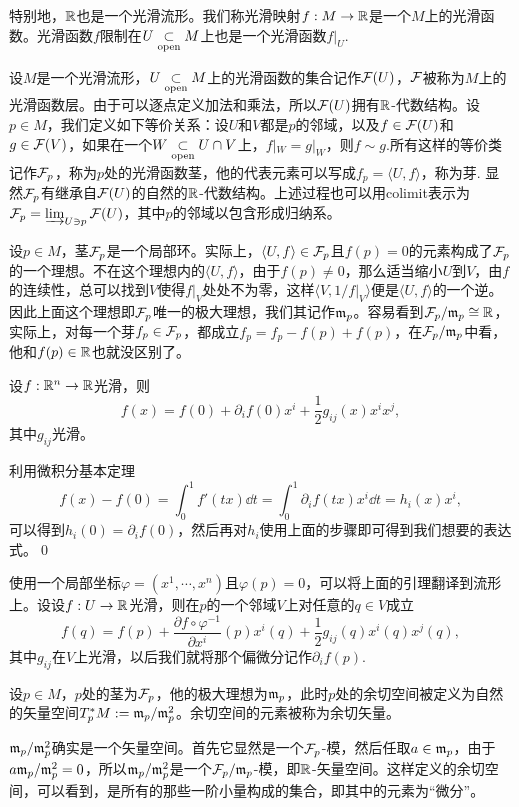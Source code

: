 特别地，$\mathbb{R}$也是一个光滑流形。我们称光滑映射$f:M\to \mathbb{R}$是一个$M$上的光滑函数。光滑函数$f$限制在$U\underset{\mathrm{open}}{\subset} M$上也是一个光滑函数$f|_U$.

\para 设$M$是一个光滑流形，$U\underset{\mathrm{open}}{\subset} M$上的光滑函数的集合记作$\mathcal{F}(U)$，$\mathcal{F}$被称为$M$上的光滑函数{\kaishu 层}。由于可以逐点定义加法和乘法，所以$\mathcal{F}(U)$拥有$\mathbb{R}$-代数结构。设$p\in M$，我们定义如下等价关系：设$U$和$V$都是$p$的邻域，以及$f\in \mathcal{F}(U)$和$g\in \mathcal{F}(V)$，如果在一个$W\underset{\mathrm{open}}{\subset} U\cap V$上，$f|_W=g|_W$，则$f\sim g$.所有这样的等价类记作$\mathcal{F}_p$，称为$p$处的光滑函数{\kaishu 茎}，他的代表元素可以写成$f_p=\langle U,f\rangle$，称为{\kaishu 芽}. 显然$\mathcal{F}_p$有继承自$\mathcal{F}(U)$的自然的$\mathbb{R}$-代数结构。上述过程也可以用colimit表示为$\mathcal{F}_p=\varinjlim_{U\ni p}\mathcal{F}(U)$，其中$p$的邻域以包含形成归纳系。

设$p\in M$，茎$\mathcal{F}_p$是一个局部环。实际上，$\langle U,f\rangle \in \mathcal{F}_p$且$f(p)= 0$的元素构成了$\mathcal{F}_p$的一个理想。不在这个理想内的$\langle U,f\rangle$，由于$f(p)\neq 0$，那么适当缩小$U$到$V$，由$f$的连续性，总可以找到$V$使得$f|_V$处处不为零，这样$\langle V,1/f|_V\rangle$便是$\langle U,f\rangle$的一个逆。因此上面这个理想即$\mathcal{F}_p$唯一的极大理想，我们其记作$\mathfrak{m}_p$。容易看到$\mathcal{F}_p/\mathfrak{m}_p\cong \mathbb{R}$，实际上，对每一个芽$f_p\in\mathcal{F}_p$，都成立$f_p=f_p-f(p)+f(p)$，在$\mathcal{F}_p/\mathfrak{m}_p$中看，他和$f(p)\in\mathbb{R}$也就没区别了。

\lem 设$f:\mathbb{R}^n\to \mathbb{R}$光滑，则
\[
	f(x)=f(0)+\partial_if(0)x^i+\frac{1}{2}g_{ij}(x)x^ix^j,
\]
其中$g_{ij}$光滑。

\proof 利用微积分基本定理
\[
	f(x)-f(0)=\int_0^1f'(tx)\dd t=\int_0^1\partial_i f(tx)x^i\dd t=h_i(x)x^i,
\]
可以得到$h_i(0)=\partial_i f(0)$，然后再对$h_i$使用上面的步骤即可得到我们想要的表达式。\qed

\para 使用一个局部坐标$\varphi=(x^1,\cdots,x^n)$且$\varphi(p)=0$，可以将上面的引理翻译到流形上。设设$f:U\to \mathbb{R}$光滑，则在$p$的一个邻域$V$上对任意的$q\in V$成立
\[
	f(q)=f(p)+\frac{\partial f\circ \varphi^{-1}}{\partial x^i}(p)x^i(q)+\frac{1}{2}g_{ij}(q)x^i(q)x^j(q),
\]
其中$g_{ij}$在$V$上光滑，以后我们就将那个偏微分记作$\partial_i f(p)$.


\para 设$p\in M$，$p$处的茎为$\mathcal{F}_p$，他的极大理想为$\mathfrak{m}_p$，此时$p$处的{\kaishu 余切空间}被定义为自然的矢量空间$T_p^*M:=\mathfrak{m}_p/\mathfrak{m}_p^2$。余切空间的元素被称为{\kaishu 余切矢量}。

$\mathfrak{m}_p/\mathfrak{m}_p^2$确实是一个矢量空间。首先它显然是一个$\mathcal{F}_p$-模，然后任取$a\in \mathfrak{m}_p$，由于$a\mathfrak{m}_p/\mathfrak{m}_p^2=0$，所以$\mathfrak{m}_p/\mathfrak{m}_p^2$是一个$\mathcal{F}_p/\mathfrak{m}_p$-模，即$\mathbb{R}$-矢量空间。这样定义的余切空间，可以看到，是所有的那些一阶小量构成的集合，即其中的元素为“{微分\kaishu}”。

